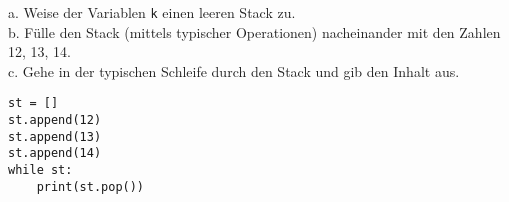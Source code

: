 \question[3]
a. Weise der Variablen \texttt{k} einen leeren Stack zu. \\
b. Fülle den Stack (mittels typischer Operationen)
nacheinander mit den Zahlen 12, 13, 14. \\
c. Gehe in der typischen Schleife durch den Stack und gib den Inhalt aus.
\begin{solutionbox}{5cm}
\begin{lstlisting}
st = []
st.append(12)
st.append(13)
st.append(14)
while st:
    print(st.pop())
\end{lstlisting}
\end{solutionbox}
